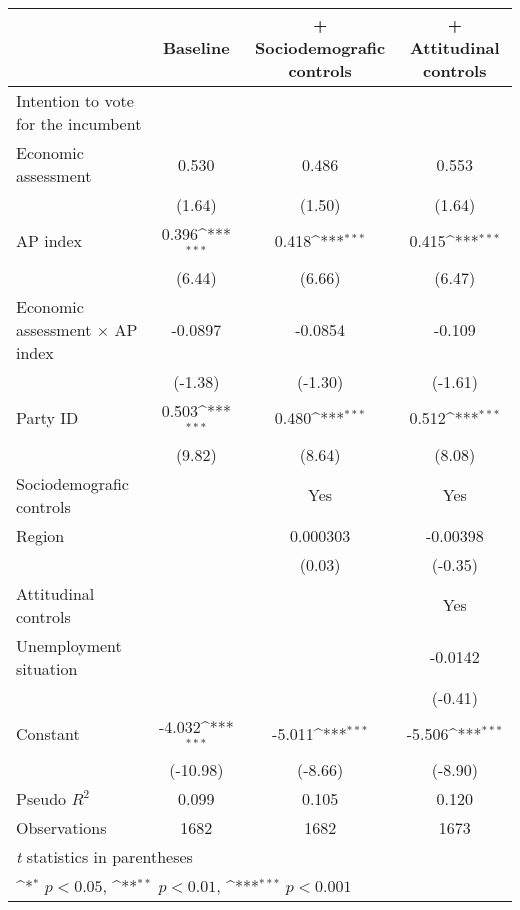 {
\def\sym#1{\ifmmode^{#1}\else\(^{#1}\)\fi}
\begin{tabular}{l*{3}{c}}
\toprule
                & Baseline         &+ Sociodemografic controls         &+ Attitudinal controls         \\
\midrule
Intention to vote for the incumbent&                  &                  &                  \\
Economic assessment&    0.530         &    0.486         &    0.553         \\
                &   (1.64)         &   (1.50)         &   (1.64)         \\
AP index        &    0.396\sym{***}&    0.418\sym{***}&    0.415\sym{***}\\
                &   (6.44)         &   (6.66)         &   (6.47)         \\
Economic assessment $\times$ AP index&  -0.0897         &  -0.0854         &   -0.109         \\
                &  (-1.38)         &  (-1.30)         &  (-1.61)         \\
Party ID        &    0.503\sym{***}&    0.480\sym{***}&    0.512\sym{***}\\
                &   (9.82)         &   (8.64)         &   (8.08)         \\
Sociodemografic controls&                  &      Yes         &      Yes         \\
Region          &                  & 0.000303         & -0.00398         \\
                &                  &   (0.03)         &  (-0.35)         \\
Attitudinal controls&                  &                  &      Yes         \\
Unemployment situation&                  &                  &  -0.0142         \\
                &                  &                  &  (-0.41)         \\
Constant        &   -4.032\sym{***}&   -5.011\sym{***}&   -5.506\sym{***}\\
                & (-10.98)         &  (-8.66)         &  (-8.90)         \\
\midrule
Pseudo \(R^{2}\)&    0.099         &    0.105         &    0.120         \\
Observations    &     1682         &     1682         &     1673         \\
\bottomrule
\multicolumn{4}{l}{\footnotesize \textit{t} statistics in parentheses}\\
\multicolumn{4}{l}{\footnotesize \sym{*} \(p<0.05\), \sym{**} \(p<0.01\), \sym{***} \(p<0.001\)}\\
\end{tabular}
}
